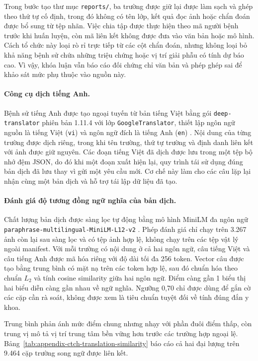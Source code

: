 Trong bước tạo thư mục \texttt{reports/}, ba trường được giữ lại được làm sạch và ghép theo thứ tự cố định, trong đó không có tên lớp, kết quả đọc ảnh hoặc chẩn đoán được bổ sung từ tệp nhãn. Việc chia tập được thực hiện theo mã người bệnh trước khi huấn luyện, còn mã liên kết không được đưa vào văn bản hoặc mô hình. Cách tổ chức này loại rò rỉ trực tiếp từ các cột chẩn đoán, nhưng không loại bỏ khả năng bệnh sử chứa những triệu chứng hoặc vị trí giải phẫu có tính dự báo cao. Vì vậy, khóa luận vẫn báo cáo đối chứng chỉ văn bản và phép ghép sai để khảo sát mức phụ thuộc vào nguồn này.

\paragraph{Công cụ dịch tiếng Anh.}
Bệnh sử tiếng Anh được tạo ngoại tuyến từ bản tiếng Việt bằng gói \texttt{deep-translator} phiên bản 1.11.4 với lớp \texttt{GoogleTranslator}, thiết lập ngôn ngữ nguồn là tiếng Việt (\texttt{vi}) và ngôn ngữ đích là tiếng Anh (\texttt{en}) \cite{DeepTranslator}. Nội dung của từng trường được dịch riêng, trong khi tên trường, thứ tự trường và định danh liên kết với ảnh được giữ nguyên. Các đoạn tiếng Việt đã dịch được lưu trong một tệp bộ nhớ đệm JSON, do đó khi một đoạn xuất hiện lại, quy trình tái sử dụng đúng bản dịch đã lưu thay vì gửi một yêu cầu mới. Cơ chế này làm cho các câu lặp lại nhận cùng một bản dịch và hỗ trợ tái lập dữ liệu đã tạo.

\paragraph{Đánh giá độ tương đồng ngữ nghĩa của bản dịch.}
Chất lượng bản dịch được sàng lọc tự động bằng mô hình MiniLM đa ngôn ngữ \texttt{paraphrase-multilingual-MiniLM-L12-v2} \cite{ParaphraseMultilingualMiniLM}. Phép đánh giá chỉ chạy trên 3.267 ảnh còn lại sau sàng lọc và có tệp ảnh hợp lệ, không chạy trên các tệp vật lý ngoài manifest. Với mỗi trường có nội dung ở cả hai ngôn ngữ, câu tiếng Việt và câu tiếng Anh được mã hóa riêng với độ dài tối đa 256 token. Vector câu được tạo bằng trung bình có mặt nạ trên các token hợp lệ, sau đó chuẩn hóa theo chuẩn $L_2$ và tính cosine similarity giữa hai ngôn ngữ. Điểm càng gần 1 biểu thị hai biểu diễn càng gần nhau về ngữ nghĩa. Ngưỡng 0,70 chỉ được dùng để gắn cờ các cặp cần rà soát, không được xem là tiêu chuẩn tuyệt đối về tính đúng đắn y khoa.

Trung bình phản ánh mức điểm chung nhưng nhạy với phần đuôi điểm thấp, còn trung vị mô tả vị trí trung tâm bền vững hơn trước các trường hợp ngoại lệ. Bảng~\ref{tab:appendix-ctch-translation-similarity} báo cáo cả hai đại lượng trên 9.464 cặp trường song ngữ được liên kết.

